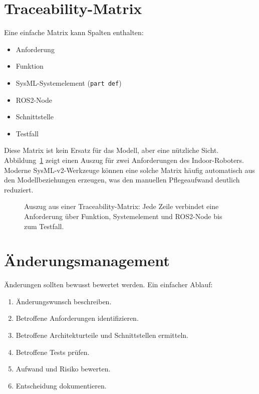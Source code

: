 \section{Traceability-Matrix}
Eine einfache Matrix kann Spalten enthalten:

\begin{itemize}
    \item Anforderung
    \item Funktion
    \item SysML-Systemelement (\texttt{part def})
    \item ROS2-Node
    \item Schnittstelle
    \item Testfall
\end{itemize}

Diese Matrix ist kein Ersatz für das Modell, aber eine nützliche Sicht. Abbildung~\ref{fig:kap20-traceability-matrix} zeigt einen Auszug für zwei Anforderungen des Indoor-Roboters. Moderne SysML-v2-Werkzeuge können eine solche Matrix häufig automatisch aus den Modellbeziehungen erzeugen, was den manuellen Pflegeaufwand deutlich reduziert.

\begin{figure}[H]
  \centering
  \caption{Auszug aus einer Traceability-Matrix: Jede Zeile verbindet eine Anforderung über Funktion, Systemelement und ROS2-Node bis zum Testfall.}
  \label{fig:kap20-traceability-matrix}
\end{figure}

\section{Änderungsmanagement}
Änderungen sollten bewusst bewertet werden. Ein einfacher Ablauf:

\begin{enumerate}
    \item Änderungswunsch beschreiben.
    \item Betroffene Anforderungen identifizieren.
    \item Betroffene Architekturteile und Schnittstellen ermitteln.
    \item Betroffene Tests prüfen.
    \item Aufwand und Risiko bewerten.
    \item Entscheidung dokumentieren.
\end{enumerate}

